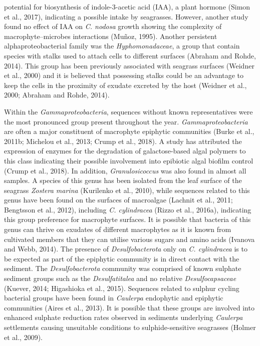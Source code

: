 \documentclass[
  12pt,
]{article}
\begin{document}
potential for biosynthesis of indole-3-acetic acid (IAA), a plant
hormone (Simon et al., 2017), indicating a possible intake by
seagrasses. However, another study found no effect of IAA on \emph{C.
nodosa} growth showing the complexity of macrophyte--microbes
interactions (Muñoz, 1995). Another persistent alphaproteobacterial
family was the \emph{Hyphomonadaceae}, a group that contain species with
stalks used to attach cells to different surfaces (Abraham and Rohde,
2014). This group has been previously associated with seagrass surfaces
(Weidner et al., 2000) and it is believed that possessing stalks could
be an advantage to keep the cells in the proximity of exudate excreted
by the host (Weidner et al., 2000; Abraham and Rohde, 2014).

Within the \emph{Gammaproteobacteria}, sequences without known
representatives were the most pronounced group present throughout the
year. \emph{Gammaproteobacteria} are often a major constituent of
macrophyte epiphytic communities (Burke et al., 2011b; Michelou et al.,
2013; Crump et al., 2018). A study has attributed the expression of
enzymes for the degradation of galactose-based algal polymers to this
class indicating their possible involvement into epibiotic algal biofilm
control (Crump et al., 2018). In addition, \emph{Granulosicoccus} was
also found in almost all samples. A species of this genus has been
isolated from the leaf surface of the seagrass \emph{Zostera marina}
(Kurilenko et al., 2010), while sequences related to this genus have
been found on the surfaces of macroalgae (Lachnit et al., 2011;
Bengtsson et al., 2012), including \emph{C. cylindracea} (Rizzo et al.,
2016a), indicating this group preference for macrophyte surfaces. It is
possible that bacteria of this genus can thrive on exudates of different
macrophytes as it is known from cultivated members that they can utilise
various sugars and amino acids (Ivanova and Webb, 2014). The presence of
\emph{Desulfobacterota} only on \emph{C. cylindracea} is to be expected
as part of the epiphytic community is in direct contact with the
sediment. The \emph{Desulfobacterota} community was comprised of known
sulphate sediment groups such as the \emph{Desulfatitalea} and no
relative \emph{Desulfocapsaceae} (Kuever, 2014; Higashioka et al.,
2015). Sequences related to sulphur cycling bacterial groups have been
found in \emph{Caulerpa} endophytic and epiphytic communities (Aires et
al., 2013). It is possible that these groups are involved into enhanced
sulphate reduction rates observed in sediments underlying
\emph{Caulerpa} settlements causing unsuitable conditions to
sulphide-sensitive seagrasses (Holmer et al., 2009).
\end{document}
